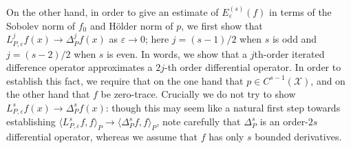 \documentclass{article}
\newcommand{\1}{\mathbf{1}}
\newcommand{\mc}[1]{\mathcal{#1}}
\newcommand{\dotp}[2]{\langle #1, #2 \rangle}
\theoremstyle{alden}
\theoremstyle{aldenthm}
\theoremstyle{definition}
\theoremstyle{remark}
\begin{document}
On the other hand, in order to give an estimate of $E_{\varepsilon}^{(s)}(f)$ in terms of the Sobolev norm of $f_0$ and H\"{o}lder norm of $p$, we first show that $L_{P,\varepsilon}^jf(x) \to \Delta_P^jf(x)$ as $\varepsilon \to 0$; here $j = (s - 1)/2$ when $s$ is odd and $j = (s - 2)/2$ when $s$ is even. In words, we show that a $j$th-order iterated difference operator approximates a $2j$-th order differential operator.  In order to establish this fact, we require that on the one hand that $p \in C^{s - 1}(\mc{X})$, and on the other hand that $f$ be zero-trace. Crucially we do not try to show $L_{P,\varepsilon}^sf(x) \to \Delta_{P}^sf(x)$: though this may seem like a natural first step towards establishing $\dotp{L_{P,\varepsilon}^sf}{f}_{P} \to \dotp{\Delta_P^sf}{f}_{P}$, note carefully that $\Delta_P^s$ is an order-$2s$ differential operator, whereas we assume that $f$ has only $s$ bounded derivatives. 


\end{document}
